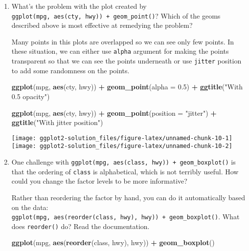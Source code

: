 \documentclass[]{book}
\newenvironment{Shaded}{\begin{snugshade}}{\end{snugshade}}
\newcommand{\KeywordTok}[1]{\textcolor[rgb]{0.13,0.29,0.53}{\textbf{#1}}}
\newcommand{\DataTypeTok}[1]{\textcolor[rgb]{0.13,0.29,0.53}{#1}}
\newcommand{\FloatTok}[1]{\textcolor[rgb]{0.00,0.00,0.81}{#1}}
\newcommand{\StringTok}[1]{\textcolor[rgb]{0.31,0.60,0.02}{#1}}
\newcommand{\OperatorTok}[1]{\textcolor[rgb]{0.81,0.36,0.00}{\textbf{#1}}}
\newcommand{\NormalTok}[1]{#1}
\begin{document}
\begin{enumerate}
\def\labelenumi{\arabic{enumi}.}
\item
  What's the problem with the plot created by
  \texttt{ggplot(mpg,\ aes(cty,\ hwy))\ +\ geom\_point()}? Which of the
  geoms described above is most effective at remedying the problem?

  Many points in this plots are overlapped so we can see only few
  points. In these situation, we can either use \texttt{alpha} argument
  for making the points transparent so that we can see the points
  underneath or use \texttt{jitter} position to add some randomness on
  the points.

\begin{Shaded}
\begin{Highlighting}[]
\KeywordTok{ggplot}\NormalTok{(mpg, }\KeywordTok{aes}\NormalTok{(cty, hwy)) }\OperatorTok{+}\StringTok{ }
\StringTok{  }\KeywordTok{geom_point}\NormalTok{(}\DataTypeTok{alpha =} \FloatTok{0.5}\NormalTok{) }\OperatorTok{+}
\StringTok{  }\KeywordTok{ggtitle}\NormalTok{(}\StringTok{"With 0.5 opacity"}\NormalTok{)}

\KeywordTok{ggplot}\NormalTok{(mpg, }\KeywordTok{aes}\NormalTok{(cty, hwy)) }\OperatorTok{+}\StringTok{ }
\StringTok{  }\KeywordTok{geom_point}\NormalTok{(}\DataTypeTok{position =} \StringTok{"jitter"}\NormalTok{) }\OperatorTok{+}
\StringTok{  }\KeywordTok{ggtitle}\NormalTok{(}\StringTok{"With jitter position"}\NormalTok{)}
\end{Highlighting}
\end{Shaded}

  \texttt{[image: ggplot2-solution\_files/figure-latex/unnamed-chunk-10-1]}
  \texttt{[image: ggplot2-solution\_files/figure-latex/unnamed-chunk-10-2]}
\item
  One challenge with
  \texttt{ggplot(mpg,\ aes(class,\ hwy))\ +\ geom\_boxplot()} is that
  the ordering of \texttt{class} is alphabetical, which is not terribly
  useful. How could you change the factor levels to be more informative?

  Rather than reordering the factor by hand, you can do it automatically
  based on the data:
  \texttt{ggplot(mpg,\ aes(reorder(class,\ hwy),\ hwy))\ +\ geom\_boxplot()}.
  What does \texttt{reorder()} do? Read the documentation.

\begin{Shaded}
\begin{Highlighting}[]
\KeywordTok{ggplot}\NormalTok{(mpg, }\KeywordTok{aes}\NormalTok{(}\KeywordTok{reorder}\NormalTok{(class, hwy), hwy)) }\OperatorTok{+}\StringTok{ }\KeywordTok{geom_boxplot}\NormalTok{()}
\end{Highlighting}
\end{Shaded}


\end{enumerate}
\end{document}

